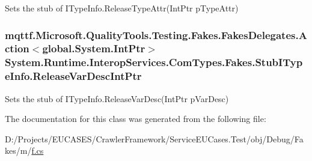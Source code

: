 Sets the stub of I\-Type\-Info.\-Release\-Type\-Attr(\-Int\-Ptr p\-Type\-Attr)

\hypertarget{class_system_1_1_runtime_1_1_interop_services_1_1_com_types_1_1_fakes_1_1_stub_i_type_info_a3035f21d47454a22d8f35bd904e5f124}{
\subsubsection[{Release\-Var\-Desc\-Int\-Ptr}]{\setlength{\rightskip}{0pt plus 5cm}mqttf.\-Microsoft.\-Quality\-Tools.\-Testing.\-Fakes.\-Fakes\-Delegates.\-Action$<$global.\-System.\-Int\-Ptr$>$ System.\-Runtime.\-Interop\-Services.\-Com\-Types.\-Fakes.\-Stub\-I\-Type\-Info.\-Release\-Var\-Desc\-Int\-Ptr}}\label{class_system_1_1_runtime_1_1_interop_services_1_1_com_types_1_1_fakes_1_1_stub_i_type_info_a3035f21d47454a22d8f35bd904e5f124}


Sets the stub of I\-Type\-Info.\-Release\-Var\-Desc(\-Int\-Ptr p\-Var\-Desc)



The documentation for this class was generated from the following file\-:\begin{DoxyCompactItemize}
\item 
D\-:/\-Projects/\-E\-U\-C\-A\-S\-E\-S/\-Crawler\-Framework/\-Service\-E\-U\-Cases.\-Test/obj/\-Debug/\-Fakes/m/\hyperlink{m_2f_8cs}{f.\-cs}\end{DoxyCompactItemize}
